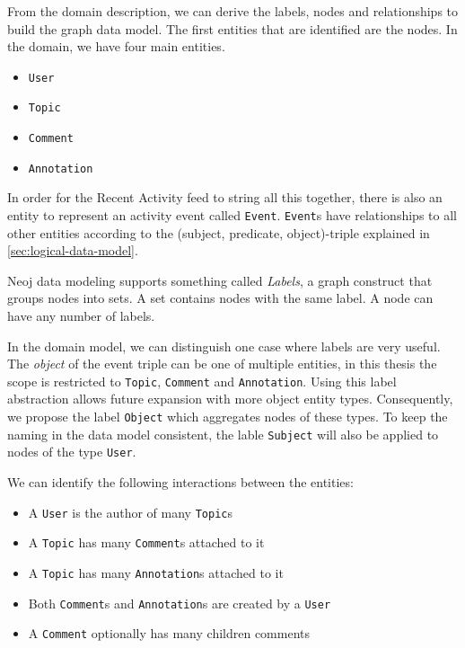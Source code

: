 




From the domain description, we can derive the labels, nodes and relationships to build the graph data model.
The first entities that are identified are the nodes.
In the domain, we have four main entities.

\begin{itemize}
  \item \texttt{User}
  \item \texttt{Topic}
  \item \texttt{Comment}
  \item \texttt{Annotation}
\end{itemize}

In order for the Recent Activity feed to string all this together, there is also an entity to represent an activity event called \texttt{Event}.
\texttt{Event}s have relationships to all other entities according to the (subject, predicate, object)-triple explained in \cref{sec:logical-data-model}.

Neoj data modeling supports something called \textit{Labels}, a graph construct that groups nodes into sets.
A set contains nodes with the same label.
A node can have any number of labels.

In the domain model, we can distinguish one case where labels are very useful.
The \textit{object} of the event triple can be one of multiple entities, in this thesis the scope is restricted to \texttt{Topic}, \texttt{Comment} and \texttt{Annotation}.
Using this label abstraction allows future expansion with more object entity types.
Consequently, we propose the label \texttt{Object} which aggregates nodes of these types.
To keep the naming in the data model consistent, the lable \texttt{Subject} will also be applied to nodes of the type \texttt{User}.

We can identify the following interactions between the entities:

\begin{itemize}
  \item A \texttt{User} is the author of many \texttt{Topic}s
  \item A \texttt{Topic} has many \texttt{Comment}s attached to it
  \item A \texttt{Topic} has many \texttt{Annotation}s attached to it
  \item Both \texttt{Comment}s and \texttt{Annotation}s are created by a \texttt{User}
  \item A \texttt{Comment} optionally has many children comments
\end{itemize}

